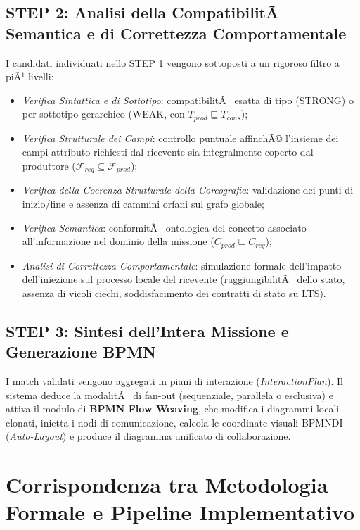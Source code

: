 ﻿\documentclass[11pt, a4paper]{report}
\begin{document}
\subsection{STEP 2: Analisi della CompatibilitÃ  Semantica e di Correttezza Comportamentale}
I candidati individuati nello STEP 1 vengono sottoposti a un rigoroso filtro a piÃ¹ livelli:
\begin{itemize}
    \item \textit{Verifica Sintattica e di Sottotipo}: compatibilitÃ  esatta di tipo (STRONG) o per sottotipo gerarchico (WEAK, con $T_{prod} \sqsubseteq T_{cons}$);
    \item \textit{Verifica Strutturale dei Campi}: controllo puntuale affinchÃ© l'insieme dei campi attributo richiesti dal ricevente sia integralmente coperto dal produttore ($\mathcal{F}_{req} \subseteq \mathcal{F}_{prod}$);
    \item \textit{Verifica della Coerenza Strutturale della Coreografia}: validazione dei punti di inizio/fine e assenza di cammini orfani sul grafo globale;
    \item \textit{Verifica Semantica}: conformitÃ  ontologica del concetto associato all'informazione nel dominio della missione ($C_{prod} \sqsubseteq C_{req}$);
    \item \textit{Analisi di Correttezza Comportamentale}: simulazione formale dell'impatto dell'iniezione sul processo locale del ricevente (raggiungibilitÃ  dello stato, assenza di vicoli ciechi, soddisfacimento dei contratti di stato su LTS).
\end{itemize}

\subsection{STEP 3: Sintesi dell'Intera Missione e Generazione BPMN}
I match validati vengono aggregati in piani di interazione (\textit{InteractionPlan}). Il sistema deduce la modalitÃ  di fan-out (sequenziale, parallela o esclusiva) e attiva il modulo di \textbf{BPMN Flow Weaving}, che modifica i diagrammi locali clonati, inietta i nodi di comunicazione, calcola le coordinate visuali BPMNDI (\textit{Auto-Layout}) e produce il diagramma unificato di collaborazione.

\section{Corrispondenza tra Metodologia Formale e Pipeline Implementativo}
\end{document}
